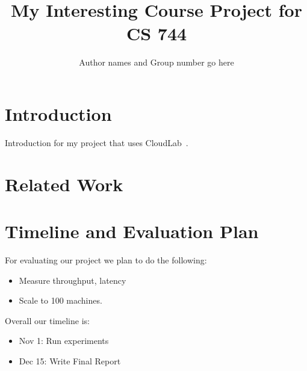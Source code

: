 \documentclass[pdftex,twocolumn,10pt,letterpaper]{article}
\begin{document}
\title{My Interesting Course Project for CS 744}
\author{Author names and Group number go here}
\date{}


\maketitle

\section{Introduction}
Introduction for my project that uses CloudLab~\cite{RicciEide:login14}.
\lipsum[4-11]
 
\section{Related Work}
\lipsum[2-5]

\section{Timeline and Evaluation Plan}
For evaluating our project we plan to do the following:
\begin{itemize}
  \item Measure throughput, latency 
  \item Scale to 100 machines.
\end{itemize}

Overall our timeline is:

\begin{itemize}
  \item Nov 1: Run experiments 
  \item Dec 15: Write Final Report
\end{itemize}

{


}
\end{document}

